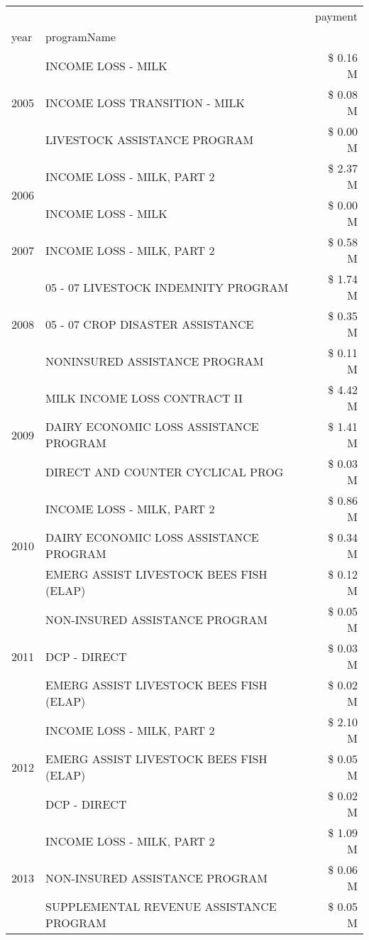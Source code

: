 \begin{tabular}{llr}
\toprule
 &  & payment \\
year & programName &  \\
\midrule
\multirow[t]{3}{*}{2005} & INCOME LOSS - MILK & \$ 0.16 M \\
 & INCOME LOSS TRANSITION - MILK & \$ 0.08 M \\
 & LIVESTOCK ASSISTANCE PROGRAM & \$ 0.00 M \\
\cline{1-3}
\multirow[t]{2}{*}{2006} & INCOME LOSS - MILK, PART 2 & \$ 2.37 M \\
 & INCOME LOSS - MILK & \$ 0.00 M \\
\cline{1-3}
2007 & INCOME LOSS - MILK, PART 2 & \$ 0.58 M \\
\cline{1-3}
\multirow[t]{3}{*}{2008} & 05 - 07 LIVESTOCK INDEMNITY PROGRAM & \$ 1.74 M \\
 & 05 - 07 CROP DISASTER ASSISTANCE & \$ 0.35 M \\
 & NONINSURED ASSISTANCE PROGRAM & \$ 0.11 M \\
\cline{1-3}
\multirow[t]{3}{*}{2009} & MILK INCOME LOSS CONTRACT II & \$ 4.42 M \\
 & DAIRY ECONOMIC LOSS ASSISTANCE PROGRAM & \$ 1.41 M \\
 & DIRECT AND COUNTER CYCLICAL PROG & \$ 0.03 M \\
\cline{1-3}
\multirow[t]{3}{*}{2010} & INCOME LOSS - MILK, PART 2 & \$ 0.86 M \\
 & DAIRY ECONOMIC LOSS ASSISTANCE PROGRAM & \$ 0.34 M \\
 & EMERG ASSIST LIVESTOCK BEES FISH (ELAP) & \$ 0.12 M \\
\cline{1-3}
\multirow[t]{3}{*}{2011} & NON-INSURED ASSISTANCE PROGRAM & \$ 0.05 M \\
 & DCP - DIRECT & \$ 0.03 M \\
 & EMERG ASSIST LIVESTOCK BEES FISH (ELAP) & \$ 0.02 M \\
\cline{1-3}
\multirow[t]{3}{*}{2012} & INCOME LOSS - MILK, PART 2 & \$ 2.10 M \\
 & EMERG ASSIST LIVESTOCK BEES FISH (ELAP) & \$ 0.05 M \\
 & DCP - DIRECT & \$ 0.02 M \\
\cline{1-3}
\multirow[t]{3}{*}{2013} & INCOME LOSS - MILK, PART 2 & \$ 1.09 M \\
 & NON-INSURED ASSISTANCE PROGRAM & \$ 0.06 M \\
 & SUPPLEMENTAL REVENUE ASSISTANCE PROGRAM & \$ 0.05 M \\

\end{tabular}

